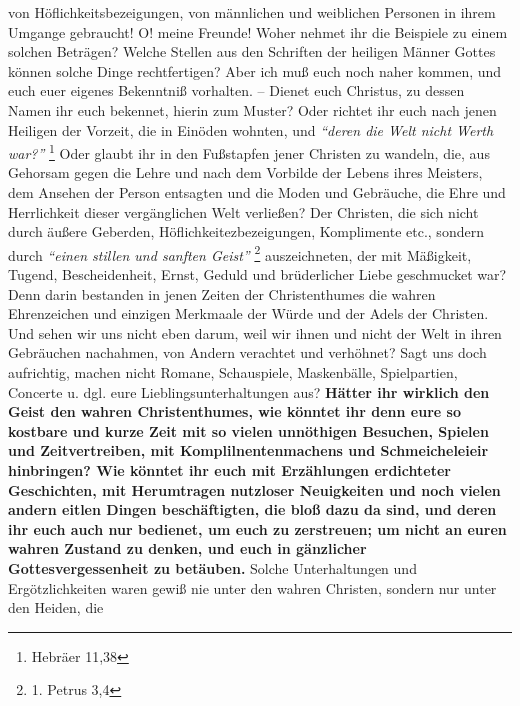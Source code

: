 von Höflichkeitsbezeigungen, von männlichen und weiblichen Personen in ihrem
Umgange gebraucht! O! meine Freunde! Woher nehmet ihr die Beispiele zu einem
solchen Beträgen? Welche Stellen aus den Schriften der heiligen Männer Gottes
können solche Dinge rechtfertigen? Aber ich muß euch noch naher kommen, und euch
euer eigenes Bekenntniß vorhalten. -- Dienet euch Christus, zu dessen Namen ihr
euch bekennet, hierin zum Muster? Oder richtet ihr euch nach jenen Heiligen der
Vorzeit, die in Einöden wohnten, und
\textit{"`deren die Welt nicht Werth war?"'}
\footnote{Hebräer 11,38}
Oder glaubt ihr in den Fußstapfen jener Christen zu
wandeln, die, aus Gehorsam gegen die Lehre und nach dem Vorbilde der Lebens
ihres Meisters, dem Ansehen der Person entsagten und die Moden und Gebräuche,
die Ehre und Herrlichkeit dieser vergänglichen Welt verließen? Der Christen, die
sich nicht durch äußere Geberden, Höflichkeitezbezeigungen, Komplimente etc.,
sondern durch
\textit{"`einen stillen und sanften Geist"'}
\footnote{1. Petrus 3,4}
auszeichneten, der mit Mäßigkeit, Tugend, Bescheidenheit, Ernst, Geduld und
brüderlicher Liebe geschmucket war? Denn darin bestanden in jenen Zeiten der
Christenthumes die wahren Ehrenzeichen und einzigen Merkmaale der Würde und der
Adels der Christen. Und sehen wir uns nicht eben darum, weil wir ihnen und nicht
der Welt in ihren Gebräuchen nachahmen, von Andern verachtet und verhöhnet? Sagt
uns doch aufrichtig, machen nicht Romane, Schauspiele, Maskenbälle,
Spielpartien, Concerte u. dgl. eure Lieblingsunterhaltungen aus? \textbf{Hätter ihr
wirklich den Geist den wahren Christenthumes, wie könntet ihr denn eure so
kostbare und kurze Zeit mit so vielen unnöthigen Besuchen, Spielen und
Zeitvertreiben, mit Komplilnentenmachens und Schmeicheleieir hinbringen? Wie
könntet ihr euch mit Erzählungen erdichteter Geschichten, mit Herumtragen
nutzloser Neuigkeiten und noch vielen andern eitlen Dingen beschäftigten, die
bloß dazu da sind, und deren ihr euch auch nur bedienet, um euch zu zerstreuen;
um nicht an euren wahren Zustand zu denken, und euch in gänzlicher
Gottesvergessenheit zu betäuben.} Solche Unterhaltungen und Ergötzlichkeiten
waren gewiß nie unter den wahren Christen, sondern nur unter den Heiden, die
